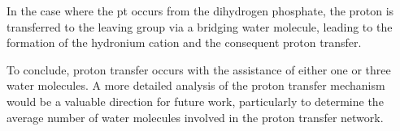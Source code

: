In the case where the \ac{pt} occurs from the dihydrogen phosphate, the proton is transferred to the leaving group via a bridging water molecule, leading to the formation of the hydronium cation and the consequent proton transfer.

To conclude, proton transfer occurs with the assistance of either one or three water molecules. A more detailed analysis of the proton transfer mechanism would be a valuable direction for future work, particularly to determine the average number of water molecules involved in the proton transfer network.
